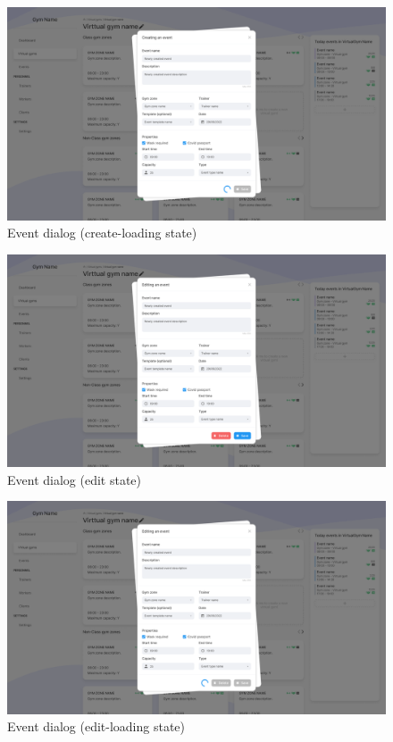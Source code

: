 \documentclass[a4paper, 12pt, oneside]{book}
\begin{document}
\begin{figure}[H]
	\centering
	\includegraphics[width=\textwidth]{assets/ui/CreateLoadingEvent.png}
	\caption{Event dialog (create-loading state)}
\end{figure}
\begin{figure}[H]
	\centering
	\includegraphics[width=\textwidth]{assets/ui/EditEvent.png}
	\caption{Event dialog (edit state)}
\end{figure}
\begin{figure}[H]
	\centering
	\includegraphics[width=\textwidth]{assets/ui/EditLoadingEvent.png}
	\caption{Event dialog (edit-loading state)}
\end{figure}
\end{document}
